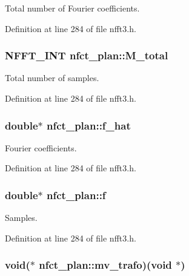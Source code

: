 Total number of Fourier coefficients. 



Definition at line 284 of file nfft3.\-h.

\hypertarget{structnfct__plan_ae0dfb03dae08036e8fe9df5243580c4a}{
\subsubsection[{M\-\_\-total}]{\setlength{\rightskip}{0pt plus 5cm}N\-F\-F\-T\-\_\-\-I\-N\-T nfct\-\_\-plan\-::\-M\-\_\-total}}\label{structnfct__plan_ae0dfb03dae08036e8fe9df5243580c4a}


Total number of samples. 



Definition at line 284 of file nfft3.\-h.

\hypertarget{structnfct__plan_af289164b09e85f75e8ed0eb3ded40d9c}{
\subsubsection[{f\-\_\-hat}]{\setlength{\rightskip}{0pt plus 5cm}double$\ast$ nfct\-\_\-plan\-::f\-\_\-hat}}\label{structnfct__plan_af289164b09e85f75e8ed0eb3ded40d9c}


Fourier coefficients. 



Definition at line 284 of file nfft3.\-h.

\hypertarget{structnfct__plan_acca00284f93bd33c00a1b099a6eec8cd}{
\subsubsection[{f}]{\setlength{\rightskip}{0pt plus 5cm}double$\ast$ nfct\-\_\-plan\-::f}}\label{structnfct__plan_acca00284f93bd33c00a1b099a6eec8cd}


Samples. 



Definition at line 284 of file nfft3.\-h.

\hypertarget{structnfct__plan_a5f9802e95bfc2ae69f22e91c1fe47778}{
\subsubsection[{mv\-\_\-trafo}]{\setlength{\rightskip}{0pt plus 5cm}void($\ast$ nfct\-\_\-plan\-::mv\-\_\-trafo)(void $\ast$)}}\label{structnfct__plan_a5f9802e95bfc2ae69f22e91c1fe47778}


